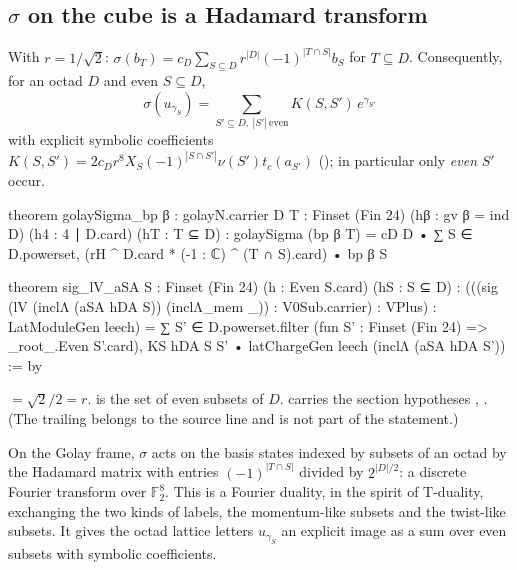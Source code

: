 \subsection{\texorpdfstring{$\sigma$ on the cube is a Hadamard transform}{sigma on the cube is a Hadamard transform}}
\begin{theorem}\label{ch13:thm:hadamard}
With $r=1/\sqrt2$: $\sigma(b_T)=c_D\sum_{S\subseteq D}r^{|D|}(-1)^{|T\cap S|}b_S$ for $T\subseteq D$. Consequently, for an
octad $D$ and even $S\subseteq D$,
\begin{equation*}
  \sigma(u_{\gamma_S})=\sum_{S'\subseteq D,\ |S'|\ \mathrm{even}}K(S,S')\,e^{\gamma_{S'}}
\end{equation*}
with explicit symbolic coefficients $K(S,S')=2c_Dr^{8}X_S(-1)^{|S\cap S'|}\nu(S')t_c(a_{S'})$ (); in
particular only \emph{even} $S'$ occur.
\end{theorem}
\begin{leancode}
theorem golaySigma_bp {β : golayN.carrier} {D T : Finset (Fin 24)} (hβ : gv β = ind D)
    (h4 : 4 ∣ D.card) (hT : T ⊆ D) :
    golaySigma (bp β T) = cD D • ∑ S ∈ D.powerset, (rH ^ D.card * (-1 : ℂ) ^ (T ∩ S).card) • bp β S

theorem sig_lV_aSA {S : Finset (Fin 24)} (h : Even S.card) (hS : S ⊆ D) :
    (((sig (lV (inclΛ (aSA hDA S)) (inclΛ_mem _)) : V0Sub.carrier) : VPlus) : LatModuleGen leech)
      = ∑ S' ∈ D.powerset.filter (fun S' : Finset (Fin 24) => _root_.Even S'.card),
          KS hDA S S' • latChargeGen leech (inclΛ (aSA hDA S')) := by
\end{leancode}
\begin{dictionary}
 $=\sqrt2/2=r$.  is the set of even subsets of $D$.
 carries the section hypotheses , . (The trailing 
belongs to the source line and is not part of the statement.)
\end{dictionary}
\begin{physics}
On the Golay frame, $\sigma$ acts on the basis states indexed by subsets of an octad by the Hadamard matrix with entries $(-1)^{|T\cap S|}$ divided by $2^{|D|/2}$: a discrete Fourier transform over $\mathbb F_2^8$. This is a Fourier duality, in the spirit of T-duality, exchanging the two kinds of labels, the momentum-like subsets and the twist-like subsets. It gives the octad lattice letters $u_{\gamma_S}$ an explicit image as a sum over even subsets with symbolic coefficients.
\end{physics}
